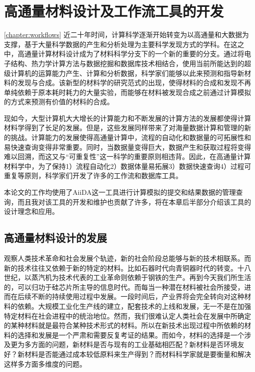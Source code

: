 \chapter{高通量材料设计及工作流工具的开发}\ref{chapter:workflows}
近二十年时间，计算科学逐渐开始转变为以高通量和大数据为支撑，基于大量科学数据的产生和分析处理为主要科学发现方式的学科。在这之中，高通量计算材料设计成为了材料科学分支下的一个新的重要的分支。通过将电子结构、热力学计算方法与数据挖掘和数据库技术相结合，使用当前所能达到的超级计算机的运算能力产生、计算和分析数据，科学家们能够以此来预测和指导新材料的发现与合成。该新型的材料学的研究范式的出现，使得材料的合成和发现不再单纯依赖于原本耗时耗力的大量实验，而能够在材料被发现合成之前通过计算模拟的方式来预测有价值的材料的合成。

现如今，大型计算机大大增长的计算能力和不断发展的计算方法的发展都使得计算材料学得到了长足的发展。但是，这些发展同样带来了对海量数据计算和管理的新的挑战。计算能力的发展使得高通量计算中，流程的自动化和数据量的可拓展性和易快速查询变得非常重要。同时，当数据量变得巨大，数据产生和获取过程将变得难以回溯，而这又与“可重复性”这一科学的重要原则相违背。因此，在高通量计算材料学中，为了保持1）流程自动化2）数据体量易拓展3）数据快速查询4）过程可重复等原则，科学家们开发了许多的工作流和数据库工具。

本论文的工作均使用了AiiDA\cite{pizzi2016aiida,huber2020aiida}这一工具进行计算模拟的提交和结果数据的管理查询，而且我对该工具的开发和维护也贡献了许多，将在本章后半部分介绍该工具的设计理念和应用。

\section{高通量材料设计的发展}
观察人类技术革命和社会发展个轨迹，新的社会阶段总能够与新的技术相联系。而新的技术往往又依赖于新的特定的材料。比如石器时代向青铜器时代的转变。十八世纪，以蒸汽机为技术代表的工业革命则依赖于钢铁的生产。再到今天我们所生活的，可以归功于硅芯片所主导的信息时代。而每当一种潜在材料被社会所接受，进而在后续不断的持续使用过程中发展。一段时间后，产业界将会完全转向对这种材料的依赖。大规模工业化生产线的建立，配套技术的上线和发展，无一不是在加强特定材料在社会进程中的统治地位。然而，我们很难认定人类社会在发展中所确定的某种材料就是最符合某种技术形式的材料。所以在新技术出现过程中所依赖的材料的选择和发展是一个严肃和需要反复考证的结果。而如今，材料的选择是一个涉及更为多方面的问题，新材料是否与现有的工业基础相匹配？新材料是否环境友好？新材料是否能通过成本较低原料来生产得到？而材料科学家就是要衡量和解决这样多方面多维度的问题。

